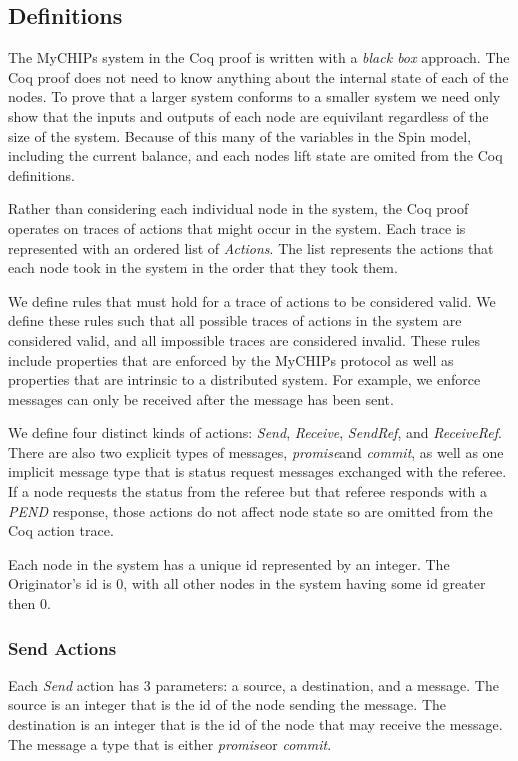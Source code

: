 \documentclass[runningheads]{llncs}
\newcommand{\promise}{\emph{promise}}
\newcommand{\commit}{\emph{commit}}
\begin{document}
\subsection{Definitions} \label{sec:definitions}
The MyCHIPs system in the Coq proof is written with a \emph{black box} approach. The Coq proof does not need to know anything about the internal state of each of the nodes. To prove that a larger system conforms to a smaller system we need only show that the inputs and outputs of each node are equivilant regardless of the size of the system. Because of this many of the variables in the Spin model, including the current balance, and each nodes lift state are omited from the Coq definitions. 

Rather than considering each individual node in the system, the Coq proof operates on traces of actions that might occur in the system. Each trace is represented with an ordered list of \emph{Actions}. The list represents the actions that each node took in the system in the order that they took them.

We define rules that must hold for a trace of actions to be considered valid. We define these rules such that all possible traces of actions in the system are considered valid, and all impossible traces are considered invalid. These rules include properties that are enforced by the MyCHIPs protocol as well as properties that are intrinsic to a distributed system. For example, we enforce  messages can only be received after the message has been sent.

We define four distinct kinds of actions: \emph{Send}, \emph{Receive}, \emph{SendRef}, and \emph{ReceiveRef}.
There are also two explicit types of messages, \promise and \commit, as well as one implicit message type that is status request messages exchanged with the referee.
If a node requests the status from the referee but that referee responds with a \emph{PEND} response, those actions do not affect node state so are omitted from the Coq action trace.

Each node in the system has a unique id represented by an integer. The Originator's id is 0, with all other nodes in the system having some id greater then 0.

\subsubsection{Send Actions}
Each \emph{Send} action has 3 parameters: a source, a destination, and a message. The source is an integer that is the id of the node sending the message. The destination is an integer that is the id of the node that may receive the message. The message a type that is either \promise or \commit.
\end{document}
